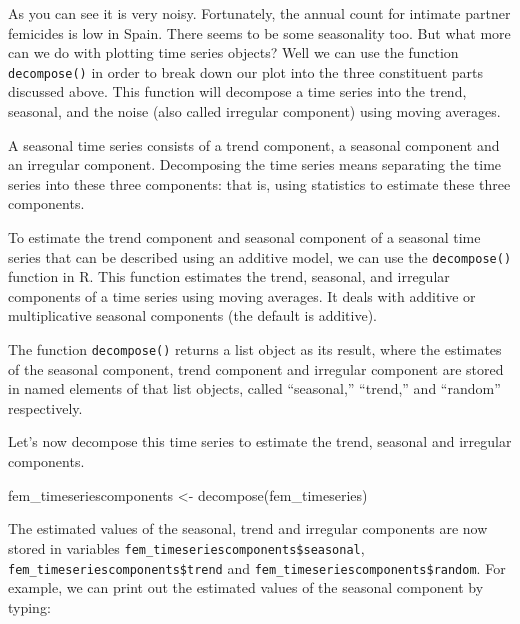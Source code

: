 \documentclass[
]{book}
\newenvironment{Shaded}{\begin{snugshade}}{\end{snugshade}}
\newcommand{\FunctionTok}[1]{\textcolor[rgb]{0.00,0.00,0.00}{#1}}
\newcommand{\NormalTok}[1]{#1}
\newcommand{\OtherTok}[1]{\textcolor[rgb]{0.56,0.35,0.01}{#1}}
\newcommand{\SpecialCharTok}[1]{\textcolor[rgb]{0.00,0.00,0.00}{#1}}
\begin{document}
As you can see it is very noisy. Fortunately, the annual count for intimate partner femicides is low in Spain. There seems to be some seasonality too. But what more can we do with plotting time series objects? Well we can use the function \texttt{decompose()} in order to break down our plot into the three constituent parts discussed above. This function will decompose a time series into the trend, seasonal, and the noise (also called irregular component) using moving averages.

A seasonal time series consists of a trend component, a seasonal component and an irregular component. Decomposing the time series means separating the time series into these three components: that is, using statistics to estimate these three components.

To estimate the trend component and seasonal component of a seasonal time series that can be described using an additive model, we can use the \texttt{decompose()} function in R. This function estimates the trend, seasonal, and irregular components of a time series using moving averages. It deals with additive or multiplicative seasonal components (the default is additive).

The function \texttt{decompose()} returns a list object as its result, where the estimates of the seasonal component, trend component and irregular component are stored in named elements of that list objects, called ``seasonal,'' ``trend,'' and ``random'' respectively.

Let's now decompose this time series to estimate the trend, seasonal and irregular components.

\begin{Shaded}
\begin{Highlighting}[]
\NormalTok{fem\_timeseriescomponents }\OtherTok{\textless{}{-}} \FunctionTok{decompose}\NormalTok{(fem\_timeseries)}
\end{Highlighting}
\end{Shaded}

The estimated values of the seasonal, trend and irregular components are now stored in variables \texttt{fem\_timeseriescomponents\$seasonal}, \texttt{fem\_timeseriescomponents\$trend} and \texttt{fem\_timeseriescomponents\$random}. For example, we can print out the estimated values of the seasonal component by typing:

\begin{Shaded}
\end{Shaded}
\end{document}
